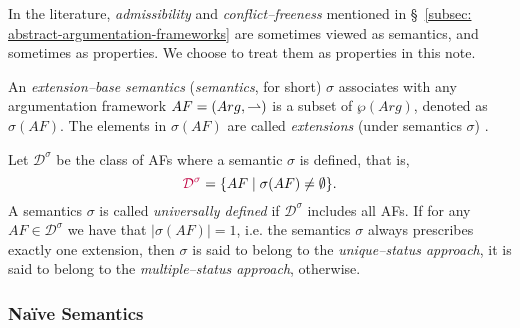 




\begin{remark}
    In the literature, 
    \textit{admissibility} and \textit{conflict--freeness} mentioned in \S~\ref{subsec: abstract-argumentation-frameworks} are sometimes viewed as semantics, and sometimes as properties.
    We choose to treat them as properties in this note.
\end{remark}




\begin{df}
\label{def: extension-semantics}
    An \textit{extension--base semantics} (\textit{semantics}, for short) $\sigma$ associates with any argumentation framework $AF = (Arg,\rightharpoonup)$ is a subset of $\wp(Arg)$, 
    denoted as {\color{purple} $\sigma(AF)$}. 
    The elements in $\sigma(AF)$ are called \textit{extensions} (under semantics $\sigma$) . 


    Let $\mathcal{D}^\sigma$ be the class of AFs where a semantic $\sigma$ is defined, 
    that is, 
    \[
        {\color{purple} \mathcal{D}^\sigma}
            = 
        \{AF \mid \sigma(AF)\not=\emptyset\}.
    \]
    A semantics $\sigma$ is called \textit{universally defined} if $\mathcal{D}^\sigma$ includes all AFs.
    If for any $AF \in \mathcal{D}^\sigma$ we have that $|\sigma(AF)| = 1$, 
    i.e. the semantics $\sigma$ always prescribes exactly one extension, 
    then $\sigma$ is said to belong to the \textit{unique--status approach}, 
    it is said to belong to the \textit{multiple--status approach}, 
    otherwise. 
\end{df}



\subsubsection{Na\"{i}ve Semantics}


